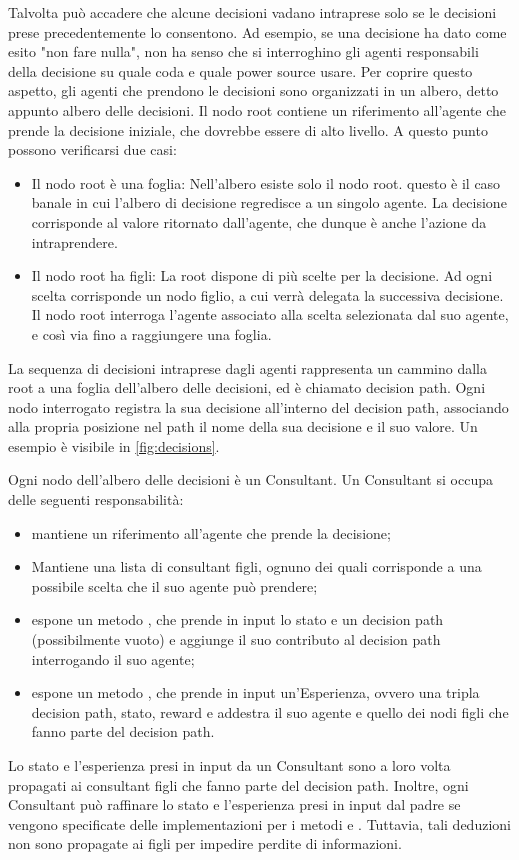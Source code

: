 \documentclass[conference]{IEEEtran}
\begin{document}
Talvolta può accadere che alcune decisioni vadano intraprese solo se le decisioni prese
precedentemente lo consentono. Ad esempio, se una decisione ha dato come esito
"non fare nulla", non ha senso che si interroghino gli agenti responsabili
della decisione su quale coda e quale power source usare. Per coprire questo aspetto,
gli agenti che prendono le decisioni sono organizzati in un albero, detto appunto
albero delle decisioni. Il nodo root contiene un riferimento all'agente che prende
la decisione iniziale, che dovrebbe essere di alto livello.
A questo punto possono verificarsi due casi:
\begin{itemize}
    \item Il nodo root è una foglia: Nell'albero esiste solo il nodo root. questo
    è il caso banale in cui l'albero di decisione regredisce a un singolo agente.
    La decisione corrisponde al valore ritornato dall'agente, che dunque è anche
    l'azione da intraprendere.
    \item Il nodo root ha figli: La root dispone di più scelte per la decisione.
    Ad ogni scelta corrisponde un nodo figlio, a cui verrà delegata la successiva
    decisione. Il nodo root interroga l'agente associato alla scelta selezionata
    dal suo agente, e così via fino a raggiungere una foglia.
\end{itemize}
La sequenza di decisioni
intraprese dagli agenti rappresenta un cammino dalla root a una foglia dell'albero
delle decisioni, ed è chiamato decision path.
Ogni nodo interrogato registra la sua decisione all'interno del decision path, 
associando alla propria posizione nel path il nome della sua decisione e il suo
valore. Un esempio è visibile in \autoref{fig:decisions}.

Ogni nodo dell'albero delle decisioni è un Consultant. Un Consultant si occupa
delle seguenti responsabilità:
\begin{itemize}
    \item mantiene un riferimento all'agente che prende la decisione;
    \item Mantiene una lista di consultant figli, ognuno dei quali corrisponde
    a una possibile scelta che il suo agente può prendere;
    \item espone un metodo , che prende in input
    lo stato e un decision path (possibilmente vuoto) e aggiunge il suo contributo
    al decision path interrogando il suo agente;
    \item espone un metodo , che prende in input un'Esperienza,
    ovvero una tripla
    decision path, stato, reward e addestra il suo agente e quello dei nodi
    figli che fanno parte del decision path.
\end{itemize}
Lo stato e l'esperienza presi in input da un Consultant sono a loro volta
propagati ai consultant figli che fanno parte del decision path. Inoltre,
ogni Consultant può raffinare lo stato e l'esperienza presi in input dal padre
se vengono specificate delle implementazioni per i metodi 
e . Tuttavia, tali deduzioni non sono propagate ai figli
per impedire perdite di informazioni. 
\end{document}
